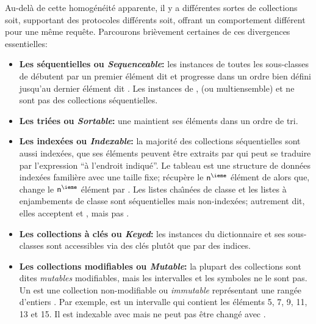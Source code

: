 \documentclass[a4paper,10pt,twoside]{book}
\begin{document}
Au-del\`a de cette homog\'en\'eit\'e apparente,
il y a diff\'erentes sortes de collections soit, supportant des protocoles 
diff\'erents soit, offrant un comportement diff\'erent pour une m\^eme requ\^ete.
Parcourons bri\`evement certaines de ces divergences essentielles:

\begin{itemize}
  \item {\bf Les s\'equentielles ou \emph{Sequenceable}:}
  les instances de toutes les sous-classes de  
d\'ebutent par un premier \'el\'ement dit  et progresse dans un ordre bien d\'efini jusqu'au
dernier \'el\'ement dit .
Les instances de ,  (ou multiensemble) et  ne sont pas
des collections s\'equentielles.

  \item {\bf Les tri\'ees ou \emph{Sortable}:}
une  maintient ses \'el\'ements dans un ordre de 
tri.

  \item {\bf Les index\'ees ou \emph{Indexable}:}
la majorit\'e des collections s\'equentielles sont aussi index\'ees, \cad
que ses \'el\'ements peuvent \^etre extraits par 	
 qui peut se traduire par l'expression ``\`a l'endroit indiqu\'e''.
	Le tableau  est une structure de donn\'ees index\'ees famili\`ere avec une taille fixe;   r\'ecup\`ere le
 $\mbox{\ct{n}}^{\ieme}$ \'el\'ement de  alors que, 
 change le $\mbox{\ct{n}}^{\ieme}$ \'el\'ement 
par .
	Les listes cha\^{\i}n\'ees de classe  et
les listes \`a enjambements de classe  sont s\'equentielles mais non-index\'ees; autrement dit, elles acceptent  et , mais pas .

  \item {\bf Les collections \`a cl\'es ou \emph{Keyed}:}
	les instances du dictionnaire  et ses sous-classes
sont accessibles via des cl\'es plut\^ot que par des indices.

  \item {\bf Les collections modifiables ou \emph{Mutable}:}
  	la plupart des collections sont dites \emph{mutables} \cad modifiables, mais les intervalles  et les symboles  ne le sont pas.
	Un  est une collection non-modifiable ou \emph{immutable} repr\'esentant une rang\'ee d'entiers .  Par exemple, 
 est un intervalle  qui contient les 
\'el\'ements 5, 7, 9, 11, 13 et 15.  Il est indexable avec  mais ne peut pas \^etre chang\'e avec .


\end{itemize}
\end{document}
